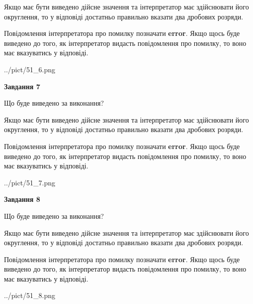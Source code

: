\documentclass[12pt, ukrainian]{article}
\begin{document}
{\begin {Large}
Якщо має бути виведено дійсне значення та інтерпретатор має здійснювати його округлення, 
то у відповіді достатньо правильно вказати два дробових розряди.

Повідомлення інтерпретатора про помилку позначати \textbf{error}.
Якщо щось буде виведено до того, як інтерпретатор видасть повідомлення про помилку, 
то воно має вказуватись у відповіді. \par

\begin{center}
	{../pict/51_6.png}
\end{center}
\newpage

{\begin {center}\textbf{Завдання 7}\end {center}}\par
Що буде виведено за виконання? \par

Якщо має бути виведено дійсне значення та інтерпретатор має здійснювати його округлення, 
то у відповіді достатньо правильно вказати два дробових розряди.

Повідомлення інтерпретатора про помилку позначати \textbf{error}.
Якщо щось буде виведено до того, як інтерпретатор видасть повідомлення про помилку, 
то воно має вказуватись у відповіді. \par

\begin{center}
	{../pict/51_7.png}
\end{center}
\newpage

{\begin {center}\textbf{Завдання 8}\end {center}}\par
Що буде виведено за виконання? \par

Якщо має бути виведено дійсне значення та інтерпретатор має здійснювати його округлення, 
то у відповіді достатньо правильно вказати два дробових розряди.

Повідомлення інтерпретатора про помилку позначати \textbf{error}.
Якщо щось буде виведено до того, як інтерпретатор видасть повідомлення про помилку, 
то воно має вказуватись у відповіді. \par

\begin{center}
	{../pict/51_8.png}
\end{center}
\newpage


\end{Large}}
\end{document}
